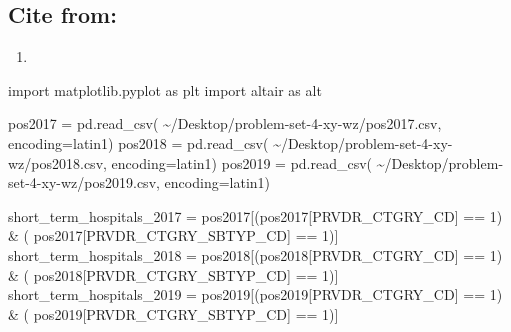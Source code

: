 \documentclass[
  letterpaper,
  DIV=11,
  numbers=noendperiod]{scrartcl}
\newenvironment{Shaded}{\begin{snugshade}}{\end{snugshade}}
\newcommand{\DecValTok}[1]{\textcolor[rgb]{0.68,0.00,0.00}{#1}}
\newcommand{\ImportTok}[1]{\textcolor[rgb]{0.00,0.46,0.62}{#1}}
\newcommand{\NormalTok}[1]{\textcolor[rgb]{0.00,0.23,0.31}{#1}}
\newcommand{\OperatorTok}[1]{\textcolor[rgb]{0.37,0.37,0.37}{#1}}
\newcommand{\StringTok}[1]{\textcolor[rgb]{0.13,0.47,0.30}{#1}}
\providecommand{\tightlist}{%
  \setlength{\itemsep}{0pt}\setlength{\parskip}{0pt}}\usepackage{longtable,booktabs,array}
\begin{document}
\subsection{Cite from:}\label{cite-from}

\begin{enumerate}
\def\labelenumi{\arabic{enumi}.}
\setcounter{enumi}{2}
\tightlist
\item
\end{enumerate}

\begin{Shaded}
\begin{Highlighting}[]
\ImportTok{import}\NormalTok{ matplotlib.pyplot }\ImportTok{as}\NormalTok{ plt}
\ImportTok{import}\NormalTok{ altair }\ImportTok{as}\NormalTok{ alt}

\NormalTok{pos2017 }\OperatorTok{=}\NormalTok{ pd.read\_csv(}
    \StringTok{\textquotesingle{}\textasciitilde{}/Desktop/problem{-}set{-}4{-}xy{-}wz/pos2017.csv\textquotesingle{}}\NormalTok{, encoding}\OperatorTok{=}\StringTok{\textquotesingle{}latin1\textquotesingle{}}\NormalTok{)}
\NormalTok{pos2018 }\OperatorTok{=}\NormalTok{ pd.read\_csv(}
    \StringTok{\textquotesingle{}\textasciitilde{}/Desktop/problem{-}set{-}4{-}xy{-}wz/pos2018.csv\textquotesingle{}}\NormalTok{, encoding}\OperatorTok{=}\StringTok{\textquotesingle{}latin1\textquotesingle{}}\NormalTok{)}
\NormalTok{pos2019 }\OperatorTok{=}\NormalTok{ pd.read\_csv(}
    \StringTok{\textquotesingle{}\textasciitilde{}/Desktop/problem{-}set{-}4{-}xy{-}wz/pos2019.csv\textquotesingle{}}\NormalTok{, encoding}\OperatorTok{=}\StringTok{\textquotesingle{}latin1\textquotesingle{}}\NormalTok{)}

\NormalTok{short\_term\_hospitals\_2017 }\OperatorTok{=}\NormalTok{ pos2017[(pos2017[}\StringTok{\textquotesingle{}PRVDR\_CTGRY\_CD\textquotesingle{}}\NormalTok{] }\OperatorTok{==} \DecValTok{1}\NormalTok{) }\OperatorTok{\&}\NormalTok{ (}
\NormalTok{    pos2017[}\StringTok{\textquotesingle{}PRVDR\_CTGRY\_SBTYP\_CD\textquotesingle{}}\NormalTok{] }\OperatorTok{==} \DecValTok{1}\NormalTok{)]}
\NormalTok{short\_term\_hospitals\_2018 }\OperatorTok{=}\NormalTok{ pos2018[(pos2018[}\StringTok{\textquotesingle{}PRVDR\_CTGRY\_CD\textquotesingle{}}\NormalTok{] }\OperatorTok{==} \DecValTok{1}\NormalTok{) }\OperatorTok{\&}\NormalTok{ (}
\NormalTok{    pos2018[}\StringTok{\textquotesingle{}PRVDR\_CTGRY\_SBTYP\_CD\textquotesingle{}}\NormalTok{] }\OperatorTok{==} \DecValTok{1}\NormalTok{)]}
\NormalTok{short\_term\_hospitals\_2019 }\OperatorTok{=}\NormalTok{ pos2019[(pos2019[}\StringTok{\textquotesingle{}PRVDR\_CTGRY\_CD\textquotesingle{}}\NormalTok{] }\OperatorTok{==} \DecValTok{1}\NormalTok{) }\OperatorTok{\&}\NormalTok{ (}
\NormalTok{    pos2019[}\StringTok{\textquotesingle{}PRVDR\_CTGRY\_SBTYP\_CD\textquotesingle{}}\NormalTok{] }\OperatorTok{==} \DecValTok{1}\NormalTok{)]}


\end{Highlighting}
\end{Shaded}
\end{document}
